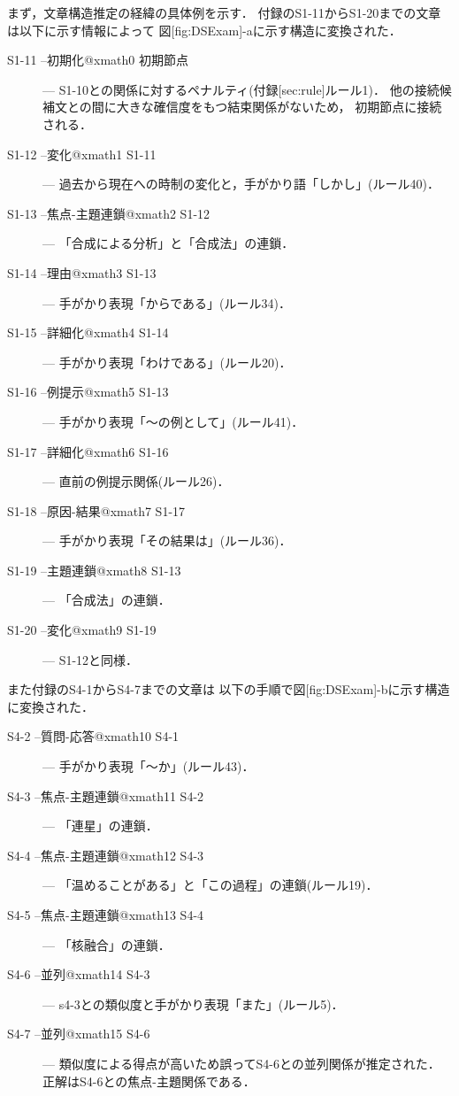 まず，文章構造推定の経緯の具体例を示す．
付録のS1-11からS1-20までの文章は以下に示す情報によって
図[fig:DSExam]-aに示す構造に変換された．
\begin{description}

\item[S1-11 --初期化@xmath0 初期節点] --- 
S1-10との関係に対するペナルティ(付録[sec:rule]ルール1)．
他の接続候補文との間に大きな確信度をもつ結束関係がないため，
初期節点に接続される．

\item[S1-12 --変化@xmath1 S1-11] --- 
過去から現在への時制の変化と，手がかり語「しかし」(ルール40)．

\item[S1-13 --焦点-主題連鎖@xmath2 S1-12] --- 
「合成による分析」と「合成法」の連鎖．

\item[S1-14 --理由@xmath3 S1-13] --- 
手がかり表現「からである」(ルール34)．

\item[S1-15 --詳細化@xmath4 S1-14] --- 
手がかり表現「わけである」(ルール20)．

\item[S1-16 --例提示@xmath5 S1-13] --- 
手がかり表現「〜の例として」(ルール41)．

\item[S1-17 --詳細化@xmath6 S1-16] --- 
直前の例提示関係(ルール26)．

\item[S1-18 --原因-結果@xmath7 S1-17] --- 
手がかり表現「その結果は」(ルール36)．

\item[S1-19 --主題連鎖@xmath8 S1-13] --- 
「合成法」の連鎖．

\item[S1-20 --変化@xmath9 S1-19] --- S1-12と同様．

\end{description}

また付録のS4-1からS4-7までの文章は
以下の手順で図[fig:DSExam]-bに示す構造に変換された．
\begin{description}

\item[S4-2 --質問-応答@xmath10 S4-1] --- 
手がかり表現「〜か」(ルール43)．

\item[S4-3 --焦点-主題連鎖@xmath11 S4-2] --- 
「連星」の連鎖．

\item[S4-4 --焦点-主題連鎖@xmath12 S4-3] --- 
「温めることがある」と「この過程」の連鎖(ルール19)．

\item[S4-5 --焦点-主題連鎖@xmath13 S4-4] ---
「核融合」の連鎖．

\item[S4-6 --並列@xmath14 S4-3] ---
s4-3との類似度と手がかり表現「また」(ルール5)．

\item[S4-7 --並列@xmath15 S4-6] ---
類似度による得点が高いため誤ってS4-6との並列関係が推定された．
正解はS4-6との焦点-主題関係である．

\end{description}

